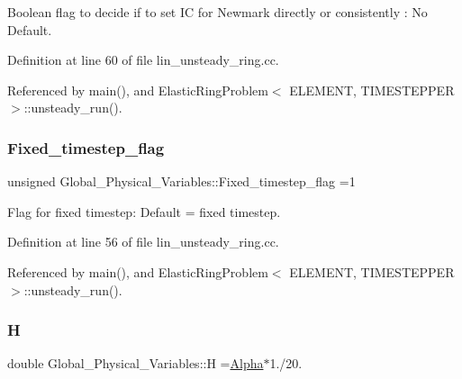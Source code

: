 Boolean flag to decide if to set IC for Newmark directly or consistently \+: No Default. 



Definition at line 60 of file lin\+\_\+unsteady\+\_\+ring.\+cc.



Referenced by main(), and Elastic\+Ring\+Problem$<$ E\+L\+E\+M\+E\+N\+T, T\+I\+M\+E\+S\+T\+E\+P\+P\+E\+R $>$\+::unsteady\+\_\+run().

\mbox{\label{namespaceGlobal__Physical__Variables_aae2e69454e5e73519e13dd3424d41a2c}} 
\subsubsection{\texorpdfstring{Fixed\+\_\+timestep\+\_\+flag}{Fixed\_timestep\_flag}}
{\footnotesize\ttfamily unsigned Global\+\_\+\+Physical\+\_\+\+Variables\+::\+Fixed\+\_\+timestep\+\_\+flag =1}



Flag for fixed timestep\+: Default = fixed timestep. 



Definition at line 56 of file lin\+\_\+unsteady\+\_\+ring.\+cc.



Referenced by main(), and Elastic\+Ring\+Problem$<$ E\+L\+E\+M\+E\+N\+T, T\+I\+M\+E\+S\+T\+E\+P\+P\+E\+R $>$\+::unsteady\+\_\+run().

\mbox{\label{namespaceGlobal__Physical__Variables_af6e07423e22c0991084d9a2f43727805}} 
\subsubsection{\texorpdfstring{H}{H}}
{\footnotesize\ttfamily double Global\+\_\+\+Physical\+\_\+\+Variables\+::H =\hyperlink{namespaceGlobal__Physical__Variables_aa2e802ee7cc8e1ac900ba94c3ce86eb7}{Alpha}$\ast$1./20.}



